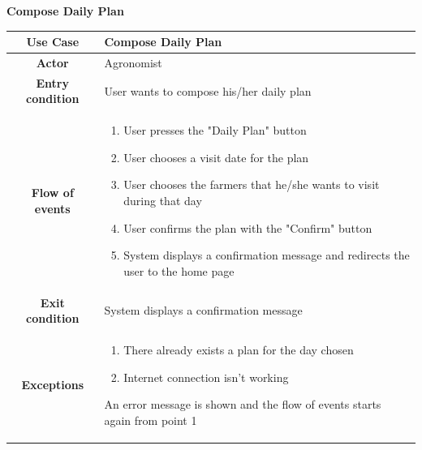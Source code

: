 \documentclass[table, 12pt]{article}
\begin{document}
\begin{itemize}
            \begin{table}[H]
                \item[] \textbf{Compose Daily Plan}
                \item[] 
                \centering
                \begin{tabular}{|c| m{}|}
                    \hline
                    \textbf{Use Case} & Compose Daily Plan\\ \hline
                    \textbf{Actor} & Agronomist\\ \hline
                    \textbf{Entry condition} & User wants to compose his/her daily plan\\  \hline
                    \textbf{Flow of events} & \begin{enumerate}
                                                \item User presses the "Daily Plan" button
                                                \item User chooses a visit date for the plan
                                                \item User chooses the farmers that he/she wants to visit during that day
                                                \item User confirms the plan with the "Confirm" button
                                                \item System displays a confirmation message and redirects the user to the home page
                                            \end{enumerate}\\ \hline
                    \textbf{Exit condition} & System displays a confirmation message\\ \hline
                    \textbf{Exceptions} &  \begin{enumerate}
                        \item There already exists a plan for the day chosen
                        \item Internet connection isn't working
                    \end{enumerate}
                    An error message is shown and the flow of events starts again from point 1\\ \hline                    
                \end{tabular}
            \end{table}


\end{itemize}
\end{document}
